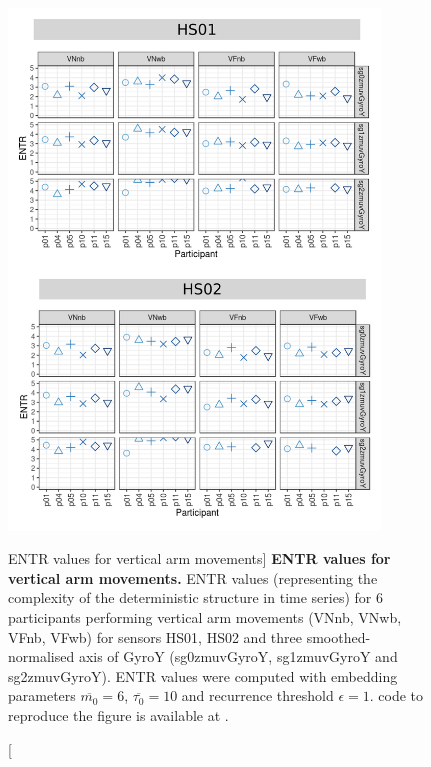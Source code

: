 \begin{figure}
\centering
\includegraphics[width=0.88\textwidth]{rqa_entr_V_w500}
    \caption
	[ENTR values for vertical arm movements]{
	{\bf ENTR values for vertical arm movements.}	
	ENTR values (representing the complexity of the deterministic 
	structure in time series) for 
	6 participants performing vertical arm movements (VNnb, VNwb, VFnb, VFwb)
	for sensors HS01, HS02 and three smoothed-normalised axis 
	of GyroY (sg0zmuvGyroY, sg1zmuvGyroY and sg2zmuvGyroY).
	ENTR values were computed with 
	embedding parameters $\overline{m_0}=6$, $\overline{\tau_0}=10$ and
	recurrence threshold $\epsilon=1$.
		\R code to reproduce the figure is available at 
		.
        }
    \label{fig:rqa_entr_V}
\end{figure}





